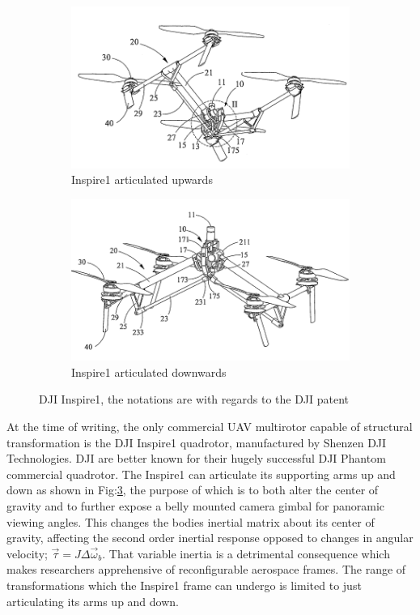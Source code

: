 \begin{figure}[hbtp]
\centering
\begin{subfigure}{.5\textwidth}
\centering
\includegraphics[width=\textwidth]{figs/dji-inspire1}
\caption{Inspire1 articulated upwards}
\label{fig:inspireup}
\end{subfigure}%
\begin{subfigure}{.5\textwidth}
\centering
\includegraphics[width=\textwidth]{figs/dji-inspire2}
\caption{Inspire1 articulated downwards}
\label{fig:inspiredown}
\end{subfigure}
\caption{DJI Inspire1, the notations are with regards to the DJI patent \cite{djinspire}}
\label{fig:inspire1}
\end{figure}
At the time of writing, the only commercial UAV multirotor capable of structural transformation is the DJI Inspire1 quadrotor\cite{inspire}, manufactured by Shenzen DJI Technologies. DJI are better known for their hugely successful DJI Phantom commercial quadrotor\cite{phantom}. The Inspire1 can articulate its supporting arms up and down as shown in Fig:\ref{fig:inspire1}, the purpose of which is to both alter the center of gravity and to further expose a belly mounted camera gimbal for panoramic viewing angles. This changes the bodies inertial matrix about its center of gravity, affecting the second order inertial response opposed to changes in angular velocity; $\vec{\tau}=J\Delta\vec{\omega}_b$. That variable inertia is a detrimental consequence which makes researchers apprehensive of reconfigurable aerospace frames. The range of transformations which the Inspire1 frame can undergo is limited to just articulating its arms up and down.
